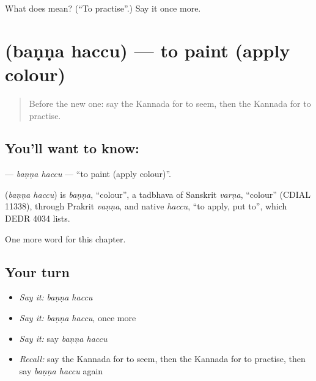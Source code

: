 \begin{tcolorbox}[breakable,colback=teal!4,colframe=teal!35!black,title={Before you move on}]
What does   mean? (\textquotedblleft{}To practise\textquotedblright{}.) Say it once more.
\end{tcolorbox}
\section[\texorpdfstring{\kn{ಬಣ್ಣ} \kn{ಹಚ್ಚು} (baṇṇa haccu)}{ಬಣ್ಣ ಹಚ್ಚು (baṇṇa haccu)}]{  (baṇṇa haccu) — to paint (apply colour)}

\label{lesson:KA-C277-banna-haccu}



\begin{quote}
Before the new one: say the Kannada for to seem, then the Kannada for to practise.
\end{quote}

\subsection*{You'll want to know:  }
\textbf{ } — \emph{baṇṇa haccu} — \textquotedblleft{}to paint (apply colour)\textquotedblright{}.

\begin{cousinweb}
\textbf{ } (\emph{baṇṇa haccu}) is \emph{baṇṇa}, \textquotedblleft{}colour\textquotedblright{}, a tadbhava of Sanskrit \emph{varṇa}, \textquotedblleft{}colour\textquotedblright{} (CDIAL 11338), through Prakrit \emph{vaṇṇa}, and native \emph{haccu}, \textquotedblleft{}to apply, put to\textquotedblright{}, which DEDR 4034 lists.
\end{cousinweb}

\begin{grammarlens}[title={What you've built}]
One more word for this chapter.
\end{grammarlens}

\subsection*{Your turn}
\begin{itemize}
\raggedright
  \item \emph{Say it:} \emph{baṇṇa haccu}
  \item \emph{Say it:} \emph{baṇṇa haccu}, once more
  \item \emph{Say it:} say \emph{baṇṇa haccu}
  \item \emph{Recall:} say the Kannada for to seem, then the Kannada for to practise, then say \emph{baṇṇa haccu} again
\end{itemize}

